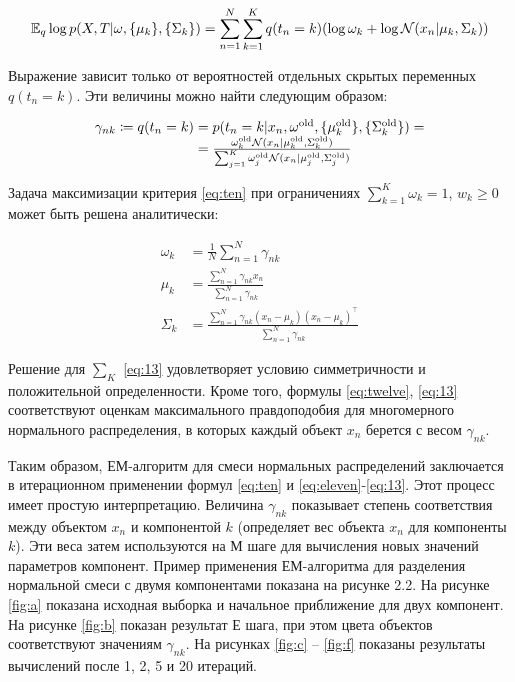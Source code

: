 \begin{equation} \label{eq:nine}
	\mathbb{E}_{q}\log{p(X, T \arrowvert \omega,  \{\mu_k\}, \{\Sigma_k\})} = \sum\limits_{n=1}^{N} \sum\limits_{k=1}^{K} q(t_n=k)(\log{\omega_k} + \log{\mathcal{N}(x_n \arrowvert \mu_k, \Sigma_k)})
\end{equation}

Выражение зависит только от вероятностей отдельных скрытых переменных $q(t_n = k)$. Эти величины можно найти следующим образом:

\begin{equation} 
	\begin{array}{r@{}l} \label{eq:ten}
		 \gamma_{nk} \coloneqq q(t_n = k) &{}= p(t_n=k \arrowvert x_n, \omega^{\text{old}}, \{\mu_k^{\text{old}}\},  \{\Sigma_k^{\text{old}}\}) = \\ 
		 &{}= \frac{\omega_k^{\text{old}} \mathcal{N}(x_n \arrowvert \mu_k^{\text{old}}, \Sigma_k^{\text{old}})}{\sum_{j=1}^{K} \omega_j^{\text{old}} \mathcal{N}(x_n \arrowvert \mu_j^{\text{old}}, \Sigma_j^{\text{old}})}
	\end{array}{}
\end{equation}

Задача максимизации критерия \ref{eq:ten} при ограничениях $\sum_{k=1}^K \omega_k = 1$, $w_k \geq 0$ может быть решена аналитически:

\begin{align}
\omega_k &= \frac{1}{N} \sum_{n=1}^{N} \gamma_{nk} \label{eq:eleven} \\
\mu_k &= \frac{\sum_{n=1}^{N} \gamma_{nk} x_n}{\sum_{n=1}^{N} \gamma_{nk}} \label{eq:twelve}\\
\Sigma_k &= \frac{\sum_{n=1}^{N} \gamma_{nk} (x_n-\mu_k)(x_n-\mu_k)^\top}{\sum_{n=1}^{N} \gamma_{nk}} \label{eq:13}
\end{align}

Решение для $\sum_{K}^{}$ \ref{eq:13} удовлетворяет условию симметричности и положительной определенности. Кроме того, формулы \ref{eq:twelve}, \ref{eq:13} соответствуют оценкам максимального правдоподобия для многомерного нормального распределения, в которых каждый объект $x_n$ берется с весом $\gamma_{nk}$.

Таким образом, ЕМ-алгоритм для смеси нормальных распределений заключается в итерационном применении формул \ref{eq:ten} и \ref{eq:eleven}-\ref{eq:13}. Этот процесс имеет простую интерпретацию. Величина $\gamma_{nk}$ показывает степень соответствия между объектом $x_n$ и компонентой $k$ (определяет вес объекта $x_n$ для компоненты $k$). Эти веса затем используются на М шаге для вычисления новых значений параметров компонент. Пример применения ЕМ-алгоритма для разделения нормальной смеси с двумя компонентами показана на рисунке 2.2. На рисунке \ref{fig:a} показана исходная выборка и     начальное приближение для двух компонент. На рисунке \ref{fig:b} показан результат Е шага, при     этом цвета объектов соответствуют     значениям $\gamma_{nk}$.     На рисунках \ref{fig:c} -- \ref{fig:f} показаны результаты вычислений после 1, 2, 5 и 20 итераций. \cite{em}

